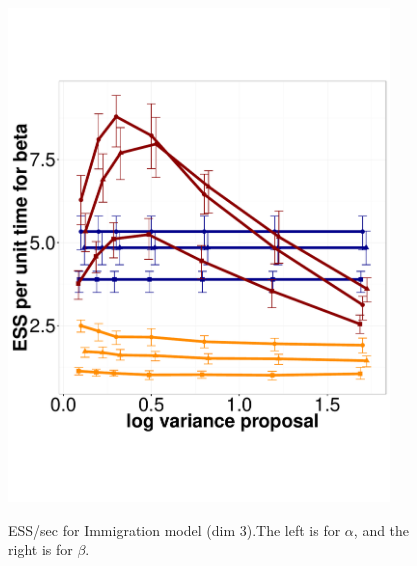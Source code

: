 \begin{figure}
\begin{minipage}[hp]{0.45\linewidth}
    \includegraphics [width=0.90\textwidth, angle=0]{figs/q_3_beta.pdf}
    \vspace{-0 in}
     \label{fig:ESS_Q_D3}
  \end{minipage}
    \caption{ESS/sec for Immigration model (dim 3).The left is for $\alpha$, and the right is for $\beta$.}
  \end{figure}

